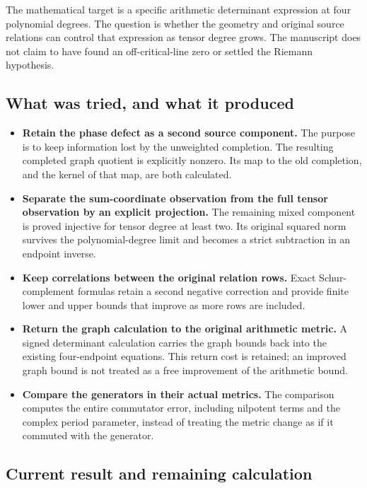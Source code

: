 \documentclass[
]{article}
\providecommand{\tightlist}{%
  \setlength{\itemsep}{0pt}\setlength{\parskip}{0pt}}
\begin{document}
The mathematical target is a specific arithmetic determinant expression
at four polynomial degrees. The question is whether the geometry and
original source relations can control that expression as tensor degree
grows. The manuscript does not claim to have found an off-critical-line
zero or settled the Riemann hypothesis.

\subsection{What was tried, and what it
produced}\label{what-was-tried-and-what-it-produced}

\begin{itemize}
\tightlist
\item
  \textbf{Retain the phase defect as a second source component.} The
  purpose is to keep information lost by the unweighted completion. The
  resulting completed graph quotient is explicitly nonzero. Its map to
  the old completion, and the kernel of that map, are both calculated.
\item
  \textbf{Separate the sum-coordinate observation from the full tensor
  observation by an explicit projection.} The remaining mixed component
  is proved injective for tensor degree at least two. Its original
  squared norm survives the polynomial-degree limit and becomes a strict
  subtraction in an endpoint inverse.
\item
  \textbf{Keep correlations between the original relation rows.} Exact
  Schur-complement formulas retain a second negative correction and
  provide finite lower and upper bounds that improve as more rows are
  included.
\item
  \textbf{Return the graph calculation to the original arithmetic
  metric.} A signed determinant calculation carries the graph bounds
  back into the existing four-endpoint equations. This return cost is
  retained; an improved graph bound is not treated as a free improvement
  of the arithmetic bound.
\item
  \textbf{Compare the generators in their actual metrics.} The
  comparison computes the entire commutator error, including nilpotent
  terms and the complex period parameter, instead of treating the metric
  change as if it commuted with the generator.
\end{itemize}

\subsection{Current result and remaining
calculation}\label{current-result-and-remaining-calculation}
\end{document}
